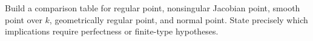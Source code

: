 \begin{problem}
Build a comparison table for regular point, nonsingular Jacobian point, smooth point over $k$, geometrically regular point, and normal point. State precisely which implications require perfectness or finite-type hypotheses.
\end{problem}
